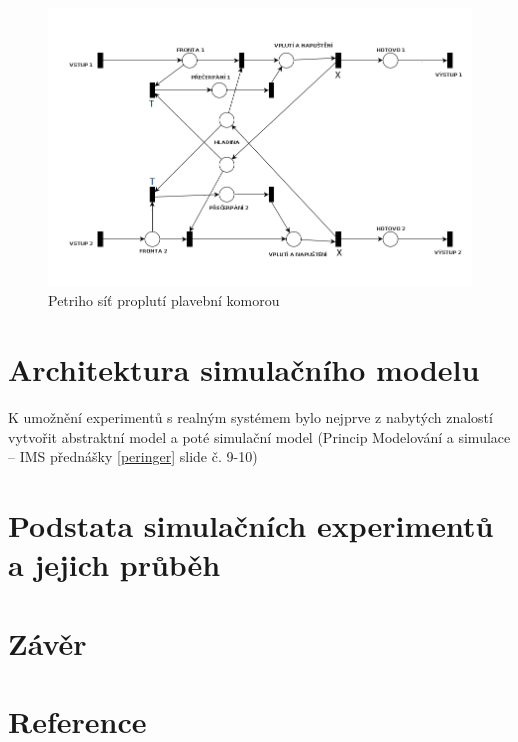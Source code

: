 \documentclass[11pt,a4paper]{article}
\begin{document}
      \begin{figure}[H]
        \centering
        \includegraphics[width=1\textwidth, natwidth=940, natheight=325]
                        {petri_net_2.png}
        \caption{Petriho síť proplutí plavební komorou \label{petri_2}}
      \end{figure}

  \section{Architektura simulačního modelu}

    K umožnění experimentů s realným systémem bylo nejprve z nabytých znalostí
    vytvořit abstraktní model a poté simulační model (Princip Modelování a 
    simulace -- IMS přednášky \ref{peringer} slide č. 9-10)

  \section{Podstata simulačních experimentů a jejich průběh}

  \section{Závěr}

  \section{Reference}
\end{document}

